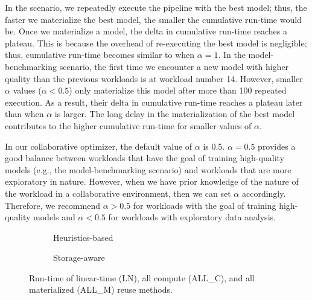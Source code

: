 In the scenario, we repeatedly execute the pipeline with the best model; thus, the faster we materialize the best model, the smaller the cumulative run-time would be.
Once we materialize a model, the delta in cumulative run-time reaches a plateau.
This is because the overhead of re-executing the best model is negligible; thus, cumulative run-time becomes similar to when $\alpha=1$.
In the model-benchmarking scenario, the first time we encounter a new model with higher quality than the previous workloads is at workload number 14.
However, smaller $\alpha$ values ($\alpha<0.5$) only materialize this model after more than 100 repeated execution.
As a result, their delta in cumulative run-time reaches a plateau later than when $\alpha$ is larger.
The long delay in the materialization of the best model contributes to the higher cumulative run-time for smaller values of $\alpha$.

In our collaborative optimizer, the default value of $\alpha$ is 0.5. 
$\alpha =0.5$ provides a good balance between workloads that have the goal of training high-quality models (e.g., the model-benchmarking scenario) and workloads that are more exploratory in nature.
However, when we have prior knowledge of the nature of the workload in a collaborative environment, then we can set $\alpha$ accordingly.
Therefore, we recommend $\alpha>0.5$ for workloads with the goal of training high-quality models and $\alpha<0.5$ for workloads with exploratory data analysis.
\begin{figure}[h]
\begin{subfigure}[b]{0.5\linewidth}
\centering
 \resizebox{\columnwidth}{!}{%
%
}
\caption{Heuristics-based}
\end{subfigure}%
\begin{subfigure}[b]{0.5\linewidth}
\centering
 \resizebox{\columnwidth}{!}{%
%
}
\caption{Storage-aware}
\end{subfigure}
\caption{Run-time of linear-time (LN), all compute (ALL\_C), and all materialized (ALL\_M) reuse methods.}
\label{reuse-experiment}
\vspace{-6mm}
\end{figure}

